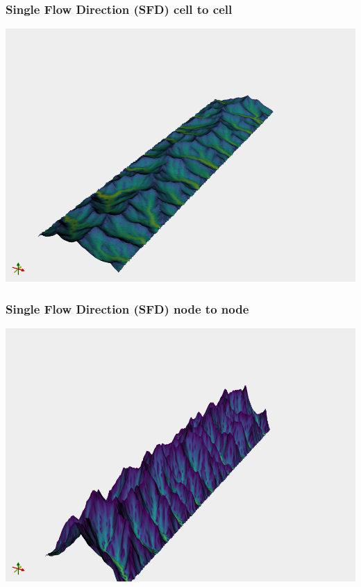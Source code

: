 \documentclass[aspectratio=169]{beamer}
\begin{document}
\begin{frame}
    \frametitle{Single Flow Direction (SFD) cell to cell}
    \includegraphics[height=0.9\paperheight]{./figures/flem-sfd-c2c.png}
\end{frame}

\begin{frame}
    \frametitle{Single Flow Direction (SFD) node to node}
    \includegraphics[height=0.9\paperheight]{./figures/flem-sfd-n2n.png}
\end{frame}
\end{document}
